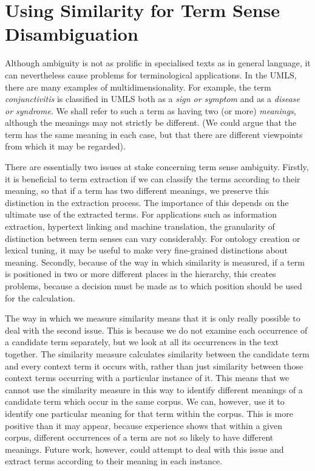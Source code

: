 \section{Using Similarity for Term Sense Disambiguation}

Although ambiguity is not as prolific in specialised texts as in
general language, it can nevertheless cause problems for
terminological applications. In the UMLS, there are many
examples of multidimensionality. For example, the term
{\it conjunctivitis} is classified in UMLS both as a {\it sign
or symptom} and as a {\it disease or syndrome}. We shall refer to
such a term as having two (or more) {\it meanings}, although the
meanings may not strictly be different. (We could argue that the term
has the same meaning in each case, but that there are different
viewpoints from which it may be regarded).
 
There are essentially two issues at stake concerning term sense
ambiguity. Firstly, it is beneficial to
term extraction if we can classify the terms according to
their meaning, so that if a term has two different meanings, we
preserve this distinction in the extraction process. The importance of
this depends on the ultimate use of the extracted terms. For
applications such as information extraction, hypertext linking and machine
translation, the granularity of distinction between term senses can vary
considerably. For ontology creation or lexical tuning, it may be
useful to make very fine-grained distinctions about
meaning. Secondly, because of the way in which similarity is measured,
if a term is positioned in two or more different places in the
hierarchy, this creates problems, because a decision must be made as to
which position should be used for the calculation.

The way in which we measure similarity means that it is only
really possible to deal with the second issue. This is because we do
not examine each occurrence of a candidate term separately, but we
look at all its occurrences in the text together. The similarity
measure calculates similarity between the candidate term and every
context term it occurs with, rather than just similarity between those
context terms occurring with a particular instance of it. This means
that we cannot use the similarity measure in this way to identify different
meanings of a candidate term which occur in the same corpus. We can,
however, use it to identify one particular meaning for that term
within the corpus. This is more positive than it may appear, because
experience shows that within a given corpus, different occurrences of
a term are not so likely to have different meanings. Future work,
however, could attempt to deal with this issue and
extract terms according to their meaning in each instance.

